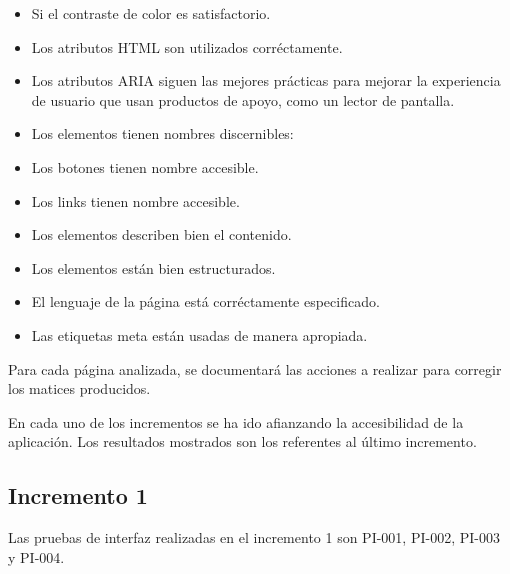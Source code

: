 \begin{itemize}
\begin{itemize}
\item Si el contraste de color es satisfactorio.
\item Los atributos HTML son utilizados corréctamente.
\item Los atributos ARIA siguen las mejores prácticas para mejorar la experiencia de usuario que usan productos de apoyo, como un lector de pantalla.
\item Los elementos tienen nombres discernibles:
\item Los botones tienen nombre accesible.
\item Los links tienen nombre accesible.
\item Los elementos describen bien el contenido.
\item Los elementos están bien estructurados.
\item El lenguaje de la página está corréctamente especificado.
\item Las etiquetas meta están usadas de manera apropiada.
\end{itemize}


Para cada página analizada, se documentará las acciones a realizar para corregir los matices producidos.


En cada uno de los incrementos se ha ido afianzando la accesibilidad de la aplicación. Los resultados mostrados son los referentes al último incremento.
\end{itemize}


\subsection{Incremento 1}

Las pruebas de interfaz realizadas en el incremento 1 son PI-001, PI-002, PI-003 y PI-004.


